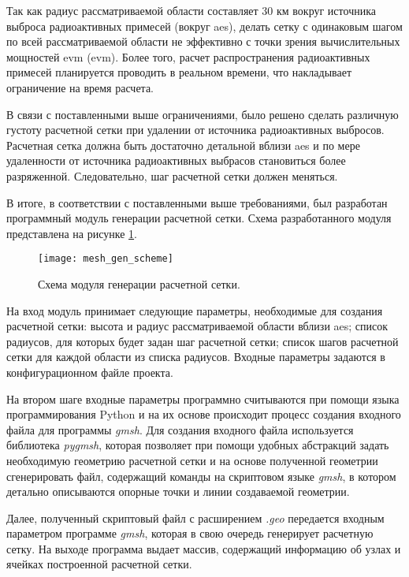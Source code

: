 Так как радиус рассматриваемой области составляет 30 км вокруг источника выброса радиоактивных примесей (вокруг \ac{aes}), 
делать сетку с одинаковым шагом по всей рассматриваемой области не эффективно с точки зрения вычислительных мощностей 
\ac{evm} (\acl{evm}). Более того, расчет распространения радиоактивных примесей планируется проводить в реальном времени, 
что накладывает ограничение на время расчета. 

В связи с поставленными выше ограничениями, было решено сделать различную густоту расчетной сетки при удалении от 
источника радиоактивных выбросов. Расчетная сетка должна быть достаточно детальной вблизи \ac{aes} и по мере удаленности 
от источника радиоактивных выбрасов становиться более разряженной. Следовательно, шаг расчетной сетки должен меняться.

В итоге, в соответствии с поставленными выше требованиями, был разработан программный модуль генерации расчетной сетки. 
Схема разработанного модуля представлена на рисунке \ref{fig_mesh_gen_scheme}. 

\begin{figure}[ht]
	\centering
	\texttt{[image: mesh\_gen\_scheme]}
	\captionsetup{justification=centering}
    \caption{Схема модуля генерации расчетной сетки.}
    \label{fig_mesh_gen_scheme}
\end{figure}

На вход модуль принимает следующие параметры, необходимые для создания расчетной сетки: высота и радиус рассматриваемой 
области вблизи \ac{aes}; список радиусов, для которых будет задан шаг расчетной сетки; список шагов расчетной сетки для 
каждой области из списка радиусов. Входные параметры задаются в конфигурационном файле проекта.

На втором шаге входные параметры программно считываются при помощи языка программирования Python и на их основе 
происходит процесс создания входного файла для программы \textit{gmsh}. Для создания входного файла используется 
библиотека \textit{pygmsh}, которая позволяет при помощи удобных абстракций задать необходимую геометрию расчетной сетки 
и на основе полученной геометрии сгенерировать файл, содержащий команды на скриптовом языке \textit{gmsh}, в котором 
детально описываются опорные точки и линии создаваемой геометрии. 

Далее, полученный скриптовый файл с расширением \textit{.geo} передается входным параметром программе \textit{gmsh}, 
которая в свою очередь генерирует расчетную сетку. На выходе программа выдает массив, содержащий информацию об узлах и 
ячейках построенной расчетной сетки.

